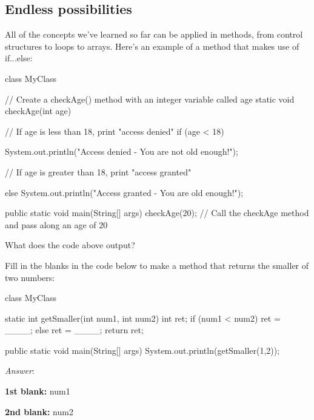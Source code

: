 \subsection{Endless possibilities} 

All of the concepts we've learned so far can be applied in methods, from control structures to loops to arrays. Here's an example of a method that makes use of if...else: 

\begin{code}
class MyClass {

  // Create a checkAge() method with an integer variable called age
  static void checkAge(int age) {

    // If age is less than 18, print "access denied"
    if (age < 18) {
      System.out.println("Access denied - You are not old enough!");

    // If age is greater than 18, print "access granted"
    } else {
      System.out.println("Access granted - You are old enough!");
    }

  }

  public static void main(String[] args) {
    checkAge(20); // Call the checkAge method and pass along an age of 20
  }
}
\end{code}

What does the code above output?

\begin{example}
Fill in the blanks in the code below to make a method that returns the smaller of two numbers:

\begin{code}
class MyClass {

  static int getSmaller(int num1, int num2) {
    int ret;
    if (num1 < num2) {
        ret = ____;
    }
    else {
        ret = ____;
    }
    return ret; 
  }

  public static void main(String[] args) {
    System.out.println(getSmaller(1,2));
  }
}
\end{code}

\noindent \emph{Answer}:

\textbf{1st blank:} num1

\textbf{2nd blank:} num2
\end{example}


